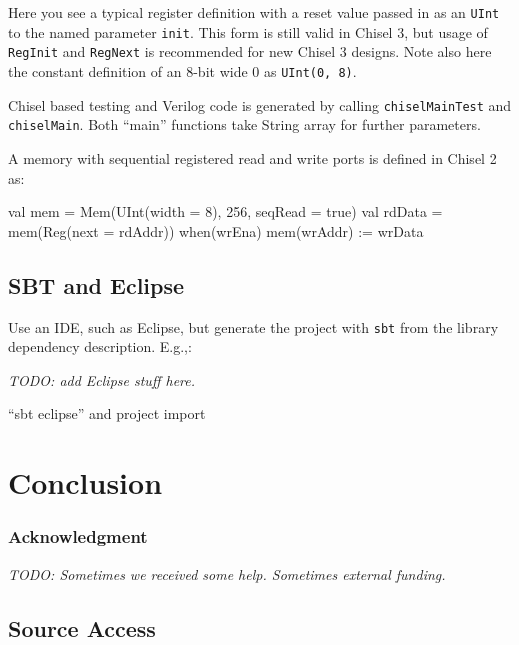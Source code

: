 \documentclass[%
    11pt, %
    headinclude, footexclude,
    openright, %
    notitlepage,
    cleardoubleempty,
    headsepline,
    pointlessnumbers,
    bibtotoc, idxtotoc,
    ]{scrbook}
\newcommand{\code}[1]{{\small{\texttt{#1}}}}
\newcommand{\todo}[1]{{\emph{TODO: #1}}}
\begin{document}
Here you see a typical register definition with a reset value passed in as
an \code{UInt} to the named parameter \code{init}. This form is still valid in Chisel 3,
but usage of \code{RegInit} and \code{RegNext} is recommended for new Chisel 3 designs.
Note also here the constant definition of an 8-bit wide 0 as \code{UInt(0, 8)}.

Chisel based testing and Verilog code is generated by calling \code{chiselMainTest}
and \code{chiselMain}. Both ``main'' functions take String array for further parameters.





A memory with sequential registered read and write ports is defined in Chisel 2 as:

\begin{chisel}
  val mem = Mem(UInt(width = 8), 256, seqRead = true)
  val rdData = mem(Reg(next = rdAddr))
  when(wrEna) {
    mem(wrAddr) := wrData
  }
\end{chisel}



\section{SBT and Eclipse}

Use an IDE, such as Eclipse, but generate the project with \code{sbt}
from the library dependency description. E.g.,:

\todo{add Eclipse stuff here.}

``sbt eclipse'' and project import

\chapter{Conclusion}
\label{sec:conclusion}

\subsection*{Acknowledgment}

\todo{Sometimes we received some help. Sometimes external funding.}



\section*{Source Access}
\end{document}
